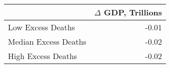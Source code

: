 \begin{tabular}{lr}
\toprule
 & $\Delta$ GDP, Trillions \\
\midrule
Low Excess Deaths & -0.01 \\
Median Excess Deaths & -0.02 \\
High Excess Deaths & -0.02 \\
\bottomrule
\end{tabular}
